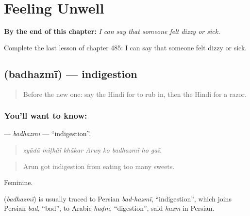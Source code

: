 
\chapter{Feeling Unwell}
\label{ch:hi-feeling-unwell}

\begin{chapteropening}
\textbf{By the end of this chapter:} \emph{I can say that someone felt dizzy or sick.}

Complete the last lesson of chapter 485: I can say that someone felt dizzy or sick.
\end{chapteropening}

\section[\texorpdfstring{\hi{बदहज़मी} (badhazmī)}{बदहज़मी (badhazmī)}]{ (badhazmī) — indigestion}

\label{lesson:HI-C485-badhazmi}



\begin{quote}
Before the new one: say the Hindi for to rub in, then the Hindi for a razor.
\end{quote}

\subsection*{You'll want to know: }
\textbf{} — \emph{badhazmī} — \textquotedblleft{}indigestion\textquotedblright{}.

\begin{quote}
       
\end{quote}

\begin{quote}
\emph{zyādā miṭhāī khākar Aruṇ ko badhazmī ho gaī.}
\end{quote}

\begin{quote}
Arun got indigestion from eating too many sweets.
\end{quote}

Feminine.

\begin{cousinweb}
\textbf{} (\emph{badhazmī}) is usually traced to Persian \emph{bad-hazmī}, \textquotedblleft{}indigestion\textquotedblright{}, which joins Persian \emph{bad}, \textquotedblleft{}bad\textquotedblright{}, to Arabic \emph{haḍm}, \textquotedblleft{}digestion\textquotedblright{}, said \emph{hazm} in Persian.
\end{cousinweb}

